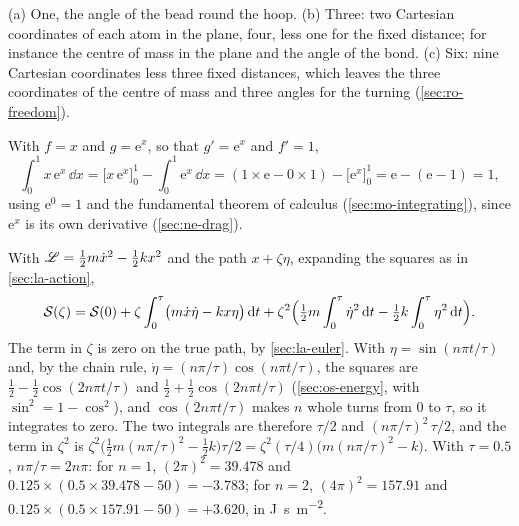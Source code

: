 \label{sec:la-solutions}

(a) One, the angle of the bead round the hoop.
(b) Three: two Cartesian coordinates of each atom in the plane, four, less
one for the fixed distance; for instance the centre of mass in the plane
and the angle of the bond. (c) Six: nine Cartesian coordinates less three
fixed distances, which leaves the three coordinates of the centre of mass
and three angles for the turning (\cref{sec:ro-freedom}).

With $f = x$ and $g = \mathrm{e}^x$, so that $g' =
\mathrm{e}^x$ and $f' = 1$,
\begin{equation*}
   \int_0^1 x\,\mathrm{e}^x\,\dd x = \bigl[x\,\mathrm{e}^x\bigr]_0^1
   - \int_0^1\mathrm{e}^x\,\dd x
   = (1\times\mathrm{e} - 0\times1) - \bigl[\mathrm{e}^x\bigr]_0^1
   = \mathrm{e} - (\mathrm{e} - 1) = 1 ,
\end{equation*}
using $\mathrm{e}^0 = 1$ and the fundamental theorem of calculus
(\cref{sec:mo-integrating}), since $\mathrm{e}^x$ is its own derivative
(\cref{sec:ne-drag}).

With $\mathscr{L} = \frac12 m\dot{x}^2 - \frac12 kx^2$
and the path $x + \zeta\eta$, expanding the squares as in
\cref{sec:la-action},
\begin{equation*}
   \mathcal{S}(\zeta) = \mathcal{S}(0) + \zeta\int_0^\tau\bigl(m\dot{x}\dot\eta - kx\eta
   \bigr)\,\mathrm{d} t + \zeta^2\Bigl(\tfrac12 m\int_0^\tau\dot\eta^2\,\mathrm{d} t
   - \tfrac12 k\int_0^\tau\eta^2\,\mathrm{d} t\Bigr) .
\end{equation*}
The term in $\zeta$ is zero on the true path, by \cref{sec:la-euler}. With $\eta = \sin(n\pi t/\tau)$ and, by the chain rule, $\dot\eta =
(n\pi/\tau)\cos(n\pi t/\tau)$, the squares are $\frac12 - \frac12\cos(2n\pi
t/\tau)$ and $\frac12 + \frac12\cos(2n\pi t/\tau)$ (\cref{sec:os-energy},
with $\sin^2 = 1 - \cos^2$), and $\cos(2n\pi t/\tau)$ makes $n$ whole
turns from 0 to $\tau$, so it integrates to zero. The two integrals are
therefore $\tau/2$ and $(n\pi/\tau)^2\,\tau/2$, and the term in $\zeta^2$
is $\zeta^2\bigl(\frac12 m(n\pi/\tau)^2 - \frac12 k\bigr)\tau/2 =
\zeta^2(\tau/4)\bigl(m(n\pi/\tau)^2 - k\bigr)$. With $\tau = 0.5$,
$n\pi/\tau = 2n\pi$: for $n = 1$, $(2\pi)^2 = 39.478$ and $0.125\times(0.5
\times39.478 - 50) = -3.783$; for $n = 2$, $(4\pi)^2 = 157.91$ and $0.125
\times(0.5\times157.91 - 50) = +3.620$, in \si{\joule\second\per\metre\squared}.

